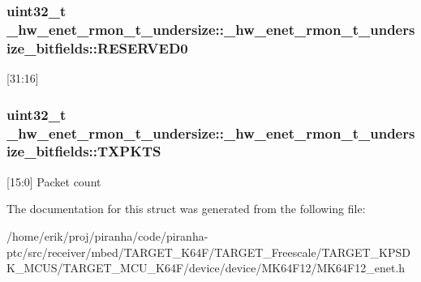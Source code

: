 \subsubsection[{\texorpdfstring{R\+E\+S\+E\+R\+V\+E\+D0}{RESERVED0}}]{\setlength{\rightskip}{0pt plus 5cm}uint32\+\_\+t \+\_\+hw\+\_\+enet\+\_\+rmon\+\_\+t\+\_\+undersize\+::\+\_\+hw\+\_\+enet\+\_\+rmon\+\_\+t\+\_\+undersize\+\_\+bitfields\+::\+R\+E\+S\+E\+R\+V\+E\+D0}\hypertarget{struct__hw__enet__rmon__t__undersize_1_1__hw__enet__rmon__t__undersize__bitfields_aa3df1262eab42e6c264f0f7d98d9dc48}{}\label{struct__hw__enet__rmon__t__undersize_1_1__hw__enet__rmon__t__undersize__bitfields_aa3df1262eab42e6c264f0f7d98d9dc48}
\mbox{[}31\+:16\mbox{]} 
\subsubsection[{\texorpdfstring{T\+X\+P\+K\+TS}{TXPKTS}}]{\setlength{\rightskip}{0pt plus 5cm}uint32\+\_\+t \+\_\+hw\+\_\+enet\+\_\+rmon\+\_\+t\+\_\+undersize\+::\+\_\+hw\+\_\+enet\+\_\+rmon\+\_\+t\+\_\+undersize\+\_\+bitfields\+::\+T\+X\+P\+K\+TS}\hypertarget{struct__hw__enet__rmon__t__undersize_1_1__hw__enet__rmon__t__undersize__bitfields_af2440e7c71aa60ef2cbceccf4024d108}{}\label{struct__hw__enet__rmon__t__undersize_1_1__hw__enet__rmon__t__undersize__bitfields_af2440e7c71aa60ef2cbceccf4024d108}
\mbox{[}15\+:0\mbox{]} Packet count 

The documentation for this struct was generated from the following file\+:\begin{DoxyCompactItemize}
\item 
/home/erik/proj/piranha/code/piranha-\/ptc/src/receiver/mbed/\+T\+A\+R\+G\+E\+T\+\_\+\+K64\+F/\+T\+A\+R\+G\+E\+T\+\_\+\+Freescale/\+T\+A\+R\+G\+E\+T\+\_\+\+K\+P\+S\+D\+K\+\_\+\+M\+C\+U\+S/\+T\+A\+R\+G\+E\+T\+\_\+\+M\+C\+U\+\_\+\+K64\+F/device/device/\+M\+K64\+F12/M\+K64\+F12\+\_\+enet.\+h\end{DoxyCompactItemize}
